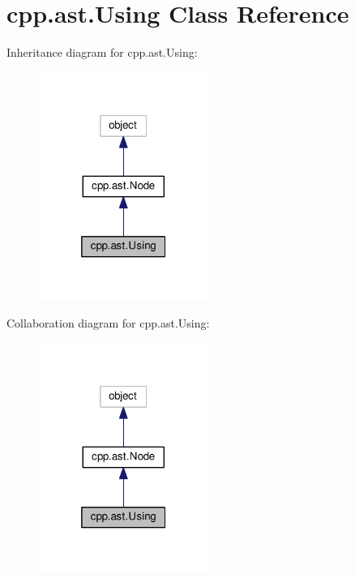 \hypertarget{classcpp_1_1ast_1_1Using}{}\section{cpp.\+ast.\+Using Class Reference}
\label{classcpp_1_1ast_1_1Using}


Inheritance diagram for cpp.\+ast.\+Using\+:
\nopagebreak
\begin{figure}[H]
\begin{center}
\leavevmode
\includegraphics[width=157pt]{classcpp_1_1ast_1_1Using__inherit__graph}
\end{center}
\end{figure}


Collaboration diagram for cpp.\+ast.\+Using\+:
\nopagebreak
\begin{figure}[H]
\begin{center}
\leavevmode
\includegraphics[width=157pt]{classcpp_1_1ast_1_1Using__coll__graph}
\end{center}
\end{figure}
